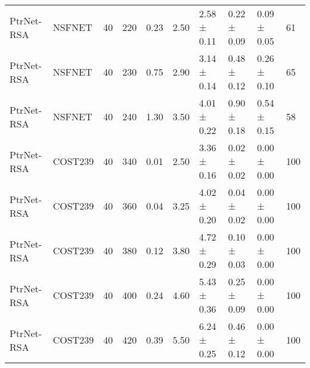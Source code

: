 \begin{longtable}[!htbp]{llll|lllll|l}
PtrNet-RSA           & NSFNET            & 40                   & 220                                                               & 0.23 & \multicolumn{1}{l|}{2.50}     & 2.58 ± 0.11 & 0.22 ± 0.09      & 0.09 ± 0.05                  & 61                                                                                    \\
PtrNet-RSA           & NSFNET            & 40                   & 230                                                               & 0.75 & \multicolumn{1}{l|}{2.90}     & 3.14 ± 0.14 & 0.48 ± 0.12      & 0.26 ± 0.10                  & 65                                                                                    \\
PtrNet-RSA           & NSFNET            & 40                   & 240                                                               & 1.30  & \multicolumn{1}{l|}{3.50}     & 4.01 ± 0.22 & 0.90 ± 0.18      & 0.54 ± 0.15                  & 58                                                                                    \\
PtrNet-RSA           & COST239           & 40                   & 340                                                               & 0.01 & \multicolumn{1}{l|}{2.50}     & 3.36 ± 0.16 & 0.02 ± 0.02      & 0.00 ± 0.00                  & 100                                                                                    \\
PtrNet-RSA           & COST239           & 40                   & 360                                                               & 0.04 & \multicolumn{1}{l|}{3.25}    & 4.02 ± 0.20  & 0.04 ± 0.02      & 0.00 ± 0.00                  & 100                                                                                    \\
PtrNet-RSA           & COST239           & 40                   & 380                                                               & 0.12 & \multicolumn{1}{l|}{3.80}     & 4.72 ± 0.29 & 0.10 ± 0.03      & 0.00 ± 0.00                  & 100                                                                                    \\
PtrNet-RSA           & COST239           & 40                   & 400                                                               & 0.24 & \multicolumn{1}{l|}{4.60}     & 5.43 ± 0.36 & 0.25 ± 0.09      & 0.00 ± 0.00                  & 100                                                                                    \\
PtrNet-RSA           & COST239           & 40                   & 420                                                               & 0.39 & \multicolumn{1}{l|}{5.50}     & 6.24 ± 0.25 & 0.46 ± 0.12      & 0.00 ± 0.00                  & 100                                                                                    \\

\end{longtable}

